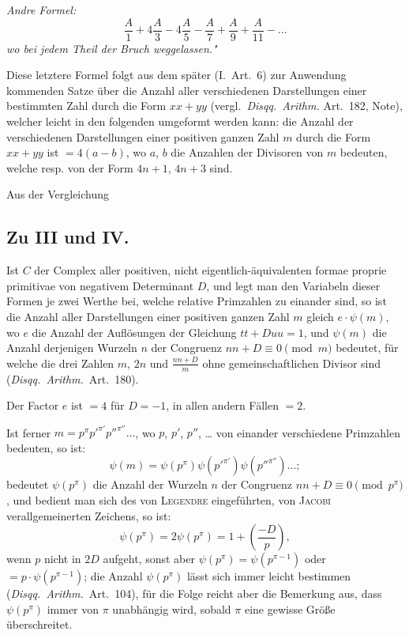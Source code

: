 \documentclass[12pt,a4paper]{article}
\begin{document}
\textit{Andre Formel:}
\[
\frac{A}{1} + 4\frac{A}{3} - 4\frac{A}{5} - \frac{A}{7} + \frac{A}{9} + \frac{A}{11} - \ldots
\]
\textit{wo bei jedem Theil der Bruch weggelassen."}

Diese letztere Formel folgt aus dem später (I.~Art.~6) zur Anwendung kommenden Satze über die Anzahl
aller verschiedenen Darstellungen einer bestimmten Zahl durch die Form $xx + yy$
(vergl.~\textit{Disqq.~Arithm.} Art.~182, Note), welcher leicht in den folgenden umgeformt werden kann:
die Anzahl der verschiedenen Darstellungen einer positiven ganzen Zahl $m$ durch die Form $xx + yy$
ist $= 4(a - b)$, wo $a$, $b$ die Anzahlen der Divisoren von $m$ bedeuten, welche resp. von der Form
$4n + 1$, $4n + 3$ sind.

Aus der Vergleichung


\subsection*{Zu III und IV.}

Ist $C$ der Complex aller positiven, nicht eigentlich-äquivalenten formae proprie primitivae von negativem
Determinant $D$, und legt man den Variabeln dieser Formen je zwei Werthe bei, welche relative
Primzahlen zu einander sind, so ist die Anzahl aller Darstellungen einer positiven ganzen Zahl $m$
gleich $e \cdot \psi(m)$, wo $e$ die Anzahl der Auflösungen der Gleichung $tt + Duu = 1$,
und $\psi(m)$ die Anzahl derjenigen Wurzeln $n$ der Congruenz $nn + D \equiv 0 \pmod{m}$ bedeutet,
für welche die drei Zahlen $m$, $2n$ und $\frac{nn+D}{m}$ ohne gemeinschaftlichen Divisor sind
(\textit{Disqq.~Arithm.}~Art.~180).

Der Factor $e$ ist $= 4$ für $D = -1$, in allen andern Fällen $= 2$.

Ist ferner $m = p^{\pi} p'^{\pi'} p''^{\pi''} \ldots$, wo $p$, $p'$, $p''$, \ldots{} von einander verschiedene Primzahlen
bedeuten, so ist:
\[
\psi(m) = \psi(p^{\pi}) \psi(p'^{\pi'}) \psi(p''^{\pi''}) \ldots;
\]
bedeutet $\psi(p^{\pi})$ die Anzahl der Wurzeln $n$ der Congruenz $nn + D \equiv 0 \pmod{p^{\pi}}$,
und bedient man sich des von \textsc{Legendre} eingeführten, von \textsc{Jacobi} verallgemeinerten Zeichens,
so ist:
\[
\psi(p^{\pi}) = 2\psi(p^{\pi}) = 1 + \left(\frac{-D}{p}\right),
\]
 wenn $p$ nicht in $2D$ aufgeht, sonst aber $\psi(p^{\pi}) = \psi(p^{\pi-1})$ oder $= p \cdot \psi(p^{\pi-1})$;
die Anzahl $\psi(p^{\pi})$ lässt sich immer leicht bestimmen (\textit{Disqq.~Arithm.}~Art.~104),
für die Folge reicht aber die Bemerkung aus, dass $\psi(p^{\pi})$ immer von $\pi$ unabhängig wird, sobald
$\pi$ eine gewisse Größe überschreitet.
\end{document}
